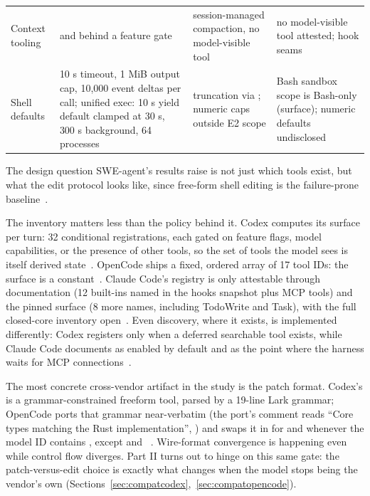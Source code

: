 \documentclass{article}
\newcommand{\codex}[0]{Codex}
\newcommand{\occ}[0]{OpenCode}
\newcommand{\ccc}[0]{Claude Code}
\begin{document}
\begin{table}[t]
\begin{tabular}{@{}L{1.7cm}L{3.75cm}L{3.75cm}L{3.75cm}@{}}
Context tooling &  and  behind a feature gate & session-managed compaction, no model-visible tool & no model-visible tool attested;  hook seams\\
Shell defaults & 10 s timeout, 1 MiB output cap, 10{,}000 event deltas per call; unified exec: 10 s yield default clamped at 30 s, 300 s background, 64 processes & truncation via ; numeric caps outside E2 scope & Bash sandbox scope is Bash-only (surface); numeric defaults undisclosed\\
\bottomrule
\end{tabular}
\end{table}

The design question SWE-agent's results raise is not just which tools
exist, but what the edit protocol looks like, since free-form shell
editing is the failure-prone baseline~\citep{yang2024sweagent}.

The inventory matters less than the policy behind it. \codex{} computes
its surface per turn: 32 conditional registrations, each gated on feature
flags, model capabilities, or the presence of other tools, so the set of
tools the model sees is itself derived
state~\citep{codexRepo}. \occ{} ships a fixed, ordered array of 17 tool
IDs: the surface is a constant~\citep{opencodeRepo}. \ccc{}'s registry is
only attestable through documentation (12 built-ins named in the hooks
snapshot plus MCP tools) and the pinned surface (8 more names, including
TodoWrite and Task), with the full closed-core inventory
open~\citep{claudeCodeDocsHooks,claudeCodePluginSurface}. Even discovery, where
it exists, is implemented differently: \codex{} registers
 only when a deferred searchable tool exists, while
\ccc{} documents  as enabled by default and as the point
where the harness waits for MCP
connections~\citep{codexRepo,claudeCodeDocsMcp}.

The most concrete cross-vendor artifact in the study is the patch format.
\codex{}'s  is a grammar-constrained freeform tool,
parsed by a 19-line Lark grammar; \occ{} ports that grammar near-verbatim
(the port's comment reads ``Core types matching the Rust
implementation'', ) and swaps it in for
 and  whenever the model ID contains
, except  and
~\citep{codexRepo,opencodeRepo}. Wire-format convergence is
happening even while control flow diverges. Part II turns out to hinge on
this same gate: the patch-versus-edit choice is exactly what changes when
the model stops being the vendor's own
(Sections~\ref{sec:compatcodex},~\ref{sec:compatopencode}).
\end{document}

